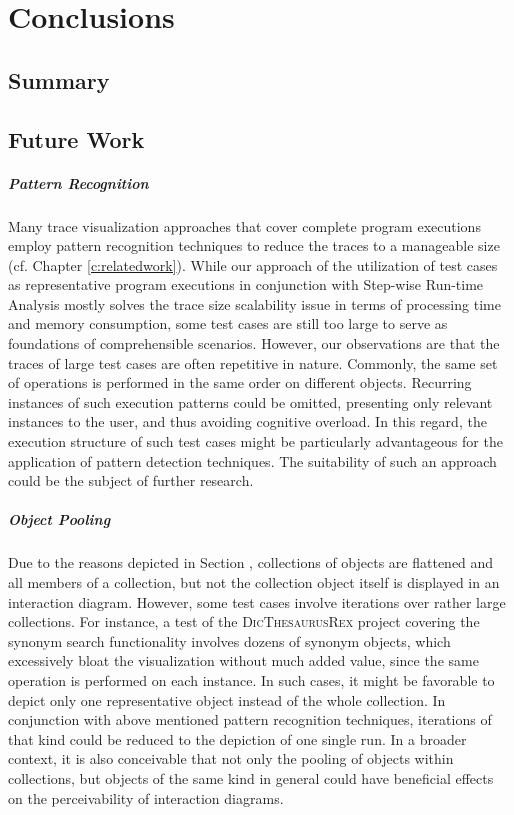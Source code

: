\chapter{Conclusions}
\label{c:conclusions}

\section{Summary}

\section{Future Work}

\paragraph{Pattern Recognition} Many trace visualization approaches that cover complete program executions employ pattern recognition techniques to reduce the traces to a manageable size (cf. Chapter \ref{c:relatedwork}).
While our approach of the utilization of test cases as representative program executions in conjunction with Step-wise Run-time Analysis mostly solves the trace size scalability issue in terms of processing time and memory consumption, some test cases are still too large to serve as foundations of comprehensible scenarios.
However, our observations are that the traces of large test cases are often repetitive in nature. Commonly, the same set of operations is performed in the same order on different objects.
Recurring instances of such execution patterns could be omitted, presenting only relevant instances to the user, and thus avoiding cognitive overload.
In this regard, the execution structure of such test cases might be particularly advantageous for the application of pattern detection techniques.
The suitability of such an approach could be the subject of further research.

\paragraph{Object Pooling} Due to the reasons depicted in Section , collections of objects are flattened and all members of a collection, but not the collection object itself is displayed in an interaction diagram. However, some test cases involve iterations over rather large collections.
For instance, a test of the \textsc{DicThesaurusRex} project covering the synonym search functionality involves dozens of synonym objects, which excessively bloat the visualization without much added value, since the same operation is performed on each instance.
In such cases, it might be favorable to depict only one representative object instead of the whole collection.
In conjunction with above mentioned pattern recognition techniques, iterations of that kind could be reduced to the depiction of one single run.
In a broader context, it is also conceivable that not only the pooling of objects within collections, but objects of the same kind in general could have beneficial effects on the perceivability of interaction diagrams.

